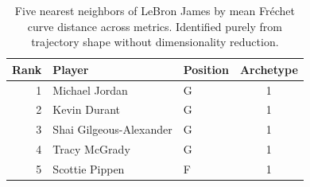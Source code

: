 \begin{table}[htbp]
  \centering\small
  \begin{tabular}{rllc}
    \toprule
    Rank & Player & Position & Archetype \\
    \midrule
    1 & Michael Jordan & G & 1 \\
    2 & Kevin Durant & G & 1 \\
    3 & Shai Gilgeous-Alexander & G & 1 \\
    4 & Tracy McGrady & G & 1 \\
    5 & Scottie Pippen & F & 1 \\
    \bottomrule
  \end{tabular}
  \caption{Five nearest neighbors of LeBron James by mean Fr\'{e}chet curve distance across metrics. Identified purely from trajectory shape without dimensionality reduction.}
  \label{tab:LeBron_James_frechet_curve_neighbors}
\end{table}

